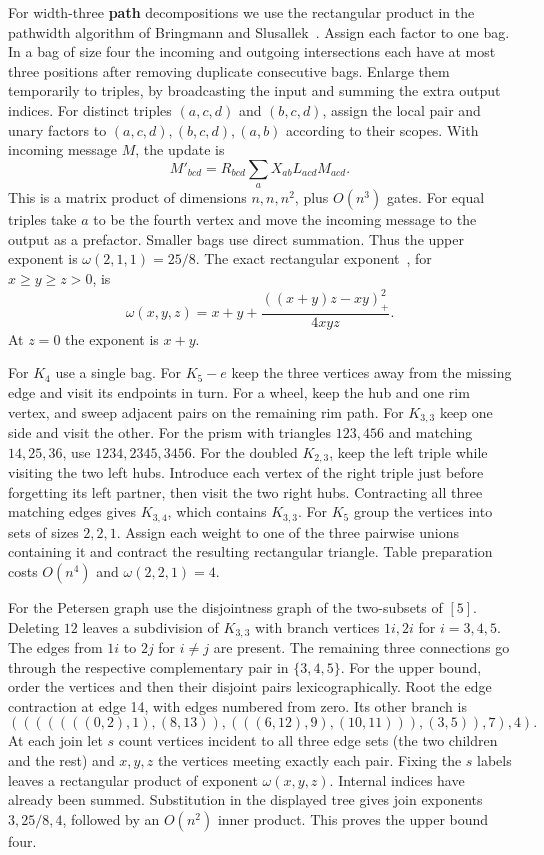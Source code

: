 \documentclass[11pt,letterpaper]{article}
\begin{document}
For width-three \textbf{path} decompositions we use the rectangular product in the pathwidth algorithm of Bringmann and Slusallek~\cite[Theorem~8, full version]{bringmann-slusallek}. Assign each factor to one bag. In a bag of size four the incoming and outgoing intersections each have at most three positions after removing duplicate consecutive bags. Enlarge them temporarily to triples, by broadcasting the input and summing the extra output indices. For distinct triples \((a,c,d)\) and \((b,c,d)\), assign the local pair and unary factors to \((a,c,d),(b,c,d),(a,b)\) according to their scopes. With incoming message \(M\), the update is
\[
 M'_{bcd}=R_{bcd}\sum_a X_{ab} L_{acd} M_{acd}.
\]
This is a matrix product of dimensions \(n,n,n^2\), plus \(O(n^3)\) gates. For equal triples take \(a\) to be the fourth vertex and move the incoming message to the output as a prefactor. Smaller bags use direct summation. Thus the upper exponent is \(\omega(2,1,1)=25/8\). The exact rectangular exponent~\cite{matrix-exponent}, for \(x\ge y\ge z>0\), is
\[
 \omega(x,y,z)=x+y+\frac{((x+y)z-xy)_+^2}{4xyz}.
\]
At \(z=0\) the exponent is \(x+y\).

For \(K_4\) use a single bag. For \(K_5-e\) keep the three vertices away from the missing edge and visit its endpoints in turn. For a wheel, keep the hub and one rim vertex, and sweep adjacent pairs on the remaining rim path. For \(K_{3,3}\) keep one side and visit the other. For the prism with triangles \(123,456\) and matching \(14,25,36\), use \(1234,2345,3456\). For the doubled \(K_{2,3}\), keep the left triple while visiting the two left hubs. Introduce each vertex of the right triple just before forgetting its left partner, then visit the two right hubs. Contracting all three matching edges gives \(K_{3,4}\), which contains \(K_{3,3}\). For \(K_5\) group the vertices into sets of sizes \(2,2,1\). Assign each weight to one of the three pairwise unions containing it and contract the resulting rectangular triangle. Table preparation costs \(O(n^4)\) and \(\omega(2,2,1)=4\).

For the Petersen graph use the disjointness graph of the two-subsets of \([5]\). Deleting \(12\) leaves a subdivision of \(K_{3,3}\) with branch vertices \(1i,2i\) for \(i=3,4,5\). The edges from \(1i\) to \(2j\) for \(i\ne j\) are present. The remaining three connections go through the respective complementary pair in \(\{3,4,5\}\). For the upper bound, order the vertices and then their disjoint pairs lexicographically. Root the edge contraction at edge 14, with edges numbered from zero. Its other branch is
\[
 (((((((0,2),1),(8,13)),(((6,12),9),(10,11))),(3,5)),7),4).
\]
At each join let \(s\) count vertices incident to all three edge sets (the two children and the rest) and \(x,y,z\) the vertices meeting exactly each pair. Fixing the \(s\) labels leaves a rectangular product of exponent \(\omega(x,y,z)\). Internal indices have already been summed. Substitution in the displayed tree gives join exponents \(3,25/8,4\), followed by an \(O(n^2)\) inner product. This proves the upper bound four.
\end{document}
